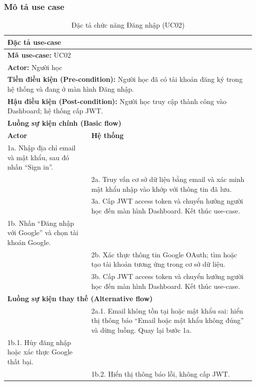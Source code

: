 \subsubsection{Mô tả use case}
\begin{table}[H]
    \centering
    \renewcommand{\arraystretch}{1.3}
    \begin{tabularx}{\linewidth}{|X|X|}
        \hline
        \multicolumn{2}{|l|}{\textbf{Đặc tả use-case}} \\ \hline
        \multicolumn{2}{|l|}{\textbf{Mã use-case:} UC02} \\ \hline
        \multicolumn{2}{|l|}{\textbf{Actor:} Người học} \\ \hline
        \multicolumn{2}{|p{\dimexpr\linewidth-2\tabcolsep-2\arrayrulewidth}|}{\textbf{Tiền điều kiện (Pre-condition):} Người học đã có tài khoản đăng ký trong hệ thống và đang ở màn hình Đăng nhập.} \\ \hline
        \multicolumn{2}{|p{\dimexpr\linewidth-2\tabcolsep-2\arrayrulewidth}|}{\textbf{Hậu điều kiện (Post-condition):} Người học truy cập thành công vào Dashboard; hệ thống cấp JWT.} \\ \hline
        \multicolumn{2}{|l|}{\textbf{Luồng sự kiện chính (Basic flow)}} \\ \hline
        \textbf{Actor} & \textbf{Hệ thống} \\ \hline
        1a. Nhập địa chỉ email và mật khẩu, sau đó nhấn ``Sign in''. & \\ \hline
        & 2a. Truy vấn cơ sở dữ liệu bằng email và xác minh mật khẩu nhập vào khớp với thông tin đã lưu. \\ \hline
        & 3a. Cấp JWT access token và chuyển hướng người học đến màn hình Dashboard. Kết thúc use-case. \\ \hline
        1b. Nhấn ``Đăng nhập với Google'' và chọn tài khoản Google. & \\ \hline
        & 2b. Xác thực thông tin Google OAuth; tìm hoặc tạo tài khoản tương ứng trong cơ sở dữ liệu. \\ \hline
        & 3b. Cấp JWT access token và chuyển hướng người học đến màn hình Dashboard. Kết thúc use-case. \\ \hline
        \multicolumn{2}{|l|}{\textbf{Luồng sự kiện thay thế (Alternative flow)}} \\ \hline
        & 2a.1. Email không tồn tại hoặc mật khẩu sai: hiển thị thông báo ``Email hoặc mật khẩu không đúng'' và dừng luồng. Quay lại bước 1a. \\ \hline
        1b.1. Hủy đăng nhập hoặc xác thực Google thất bại. & \\ \hline
        & 1b.2. Hiển thị thông báo lỗi, không cấp JWT. \\ \hline
    \end{tabularx}
    \caption{Đặc tả chức năng Đăng nhập (UC02)}
    \label{tab:uc02_spec}
\end{table}

